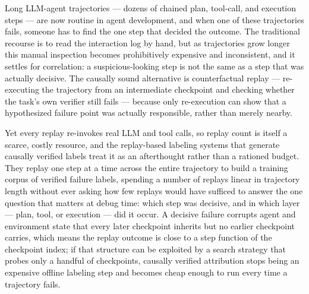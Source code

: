 \documentclass[11pt]{article}
\begin{document}
Long LLM-agent trajectories --- dozens of chained plan, tool-call, and execution steps --- are now routine in agent development, and when one of these trajectories fails, someone has to find the one step that decided the outcome. The traditional recourse is to read the interaction log by hand, but as trajectories grow longer this manual inspection becomes prohibitively expensive and inconsistent, and it settles for correlation: a suspicious-looking step is not the same as a step that was actually decisive. The causally sound alternative is counterfactual replay --- re-executing the trajectory from an intermediate checkpoint and checking whether the task's own verifier still fails --- because only re-execution can show that a hypothesized failure point was actually responsible, rather than merely nearby.

Yet every replay re-invokes real LLM and tool calls, so replay count is itself a scarce, costly resource, and the replay-based labeling systems that generate causally verified labels treat it as an afterthought rather than a rationed budget. They replay one step at a time across the entire trajectory to build a training corpus of verified failure labels, spending a number of replays linear in trajectory length without ever asking how few replays would have sufficed to answer the one question that matters at debug time: which step was decisive, and in which layer --- plan, tool, or execution --- did it occur. A decisive failure corrupts agent and environment state that every later checkpoint inherits but no earlier checkpoint carries, which means the replay outcome is close to a step function of the checkpoint index; if that structure can be exploited by a search strategy that probes only a handful of checkpoints, causally verified attribution stops being an expensive offline labeling step and becomes cheap enough to run every time a trajectory fails.
\end{document}
